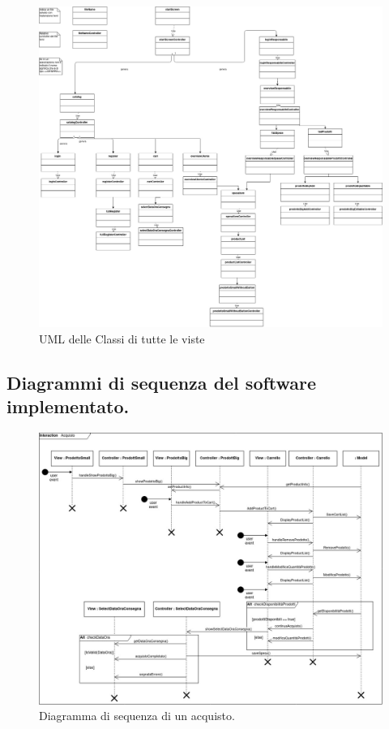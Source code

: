 \documentclass{article}
\begin{document}
\begin{figure}[h!]
	\centering
	\includegraphics[width=\textwidth]{UmlInterfaccie.jpg}
	\caption{UML delle Classi di tutte le viste}
	\label{fig:UmlInterfaccie}
\end{figure}

\clearpage
\subsection{Diagrammi di sequenza del software implementato.}
\begin{figure}[h!]
	\centering
	\includegraphics[width=\textwidth]{SDAcquisto.jpg}
	\caption{Diagramma di sequenza di un acquisto.}
	\label{SDAcquisto.jpg}
	\newpage
\end{figure}
\end{document}
